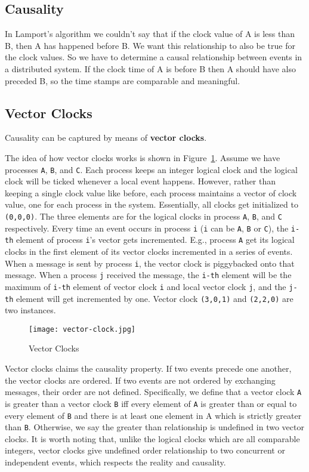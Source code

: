 \documentclass[twoside]{article}
\begin{document}
\subsection{Causality}
In Lamport's algorithm we couldn't say that if the clock value of A is less than B, then A has happened before B. We want this relationship to also be true for the clock values. So we have to determine a causal relationship between events in a distributed system. If the clock time of A is before B then A should have also preceded B, so the time stamps are comparable and meaningful.

\subsection{Vector Clocks}
Causality can be captured by means of \textbf{vector clocks}. 

The idea of how vector clocks works is shown in Figure~\ref{fig:vector-clock}. Assume we have processes \verb|A|, \verb|B|, and \verb|C|. Each process keeps an integer logical clock and the logical clock will be ticked whenever a local event happens. However, rather than keeping a single clock value like before, each process maintains a vector of clock value, one for each process in the system. Essentially, all clocks get initialized to \verb|(0,0,0)|. The three elements are for the logical clocks in process \verb|A|, \verb|B|, and \verb|C| respectively. Every time an event occurs in process \verb|i| (\verb|i| can be \verb|A|, \verb|B| or \verb|C|), the \verb|i-th| element of process \verb|i|'s vector gets incremented. E.g., process \verb|A| get its logical clocks in the first element of its vector clocks incremented in a series of events. When a message is sent by process \verb|i|, the vector clock is piggybacked onto that message. When a process \verb|j| received the message, the \verb|i-th| element will be the maximum of \verb|i-th| element of vector clock \verb|i| and local vector clock \verb|j|, and the \verb|j-th| element will get incremented by one. Vector clock \verb|(3,0,1)| and \verb|(2,2,0)| are two instances.

\begin{figure}[H]
    \centering
    \texttt{[image: vector-clock.jpg]}
    \caption{Vector Clocks}
    \label{fig:vector-clock}
\end{figure}

Vector clocks claims the causality property. If two events precede one another, the vector clocks are ordered. If two events are not ordered by exchanging messages, their order are not defined. Specifically, we define that a vector clock \verb|A| is greater than a vector clock \verb|B| iff every element of \verb|A| is greater than or equal to every element of \verb|B| and there is at least one element in A which is strictly greater than \verb|B|. Otherwise, we say the greater than relationship is undefined in two vector clocks. It is worth noting that, unlike the logical clocks which are all comparable integers, vector clocks give undefined order relationship to two concurrent or independent events, which respects the reality and causality.
\end{document}
